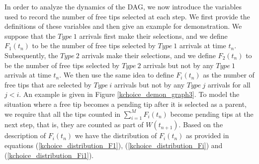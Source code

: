 \documentclass[12pt]{article}
\numberwithin{equation}{section}  %
\begin{document}
In order to analyze the dynamics of the DAG, we now introduce the variables used to record the number of free tips selected at each step. We first provide the definitions of these variables and then give an example for demonstration. We suppose that the {$Type\ 1$} arrivals first make their selections, and we define $F_1(t_n)$ to be the number of free tips selected by {$Type\ 1$} arrivals at time $t_n$. Subsequently, the {$Type\ 2$} arrivals make their selections, and we define $F_2(t_n)$ to be the number of free tips selected by {$Type\ 2$} arrivals but not by any {$Type\ 1$} arrivals at time $t_n$. We then use the same idea to define $F_i(t_n)$ as the number of free tips that are selected by {$Type\ i$} arrivals but not by any {$Type\ j$} arrivals for all $j<i$. An example is given in Figure \ref{kchoice_demon_graph3}. To model the situation where a free tip becomes a pending tip after it is selected as a parent, we require that all the tips counted in $\sum_{i=1}^M F_i(t_n)$ become pending tips at the next step, that is, they are counted as part of $W(t_{n+1})$. Based on the description of $F_i(t_n)$ we have the distribution of $F_i(t_n)$ as provided in equations (\ref{kchoice_distribution_F1}), (\ref{kchoice_distribution_Fi}) and (\ref{kchoice_distribution_Fi1}).
\end{document}

